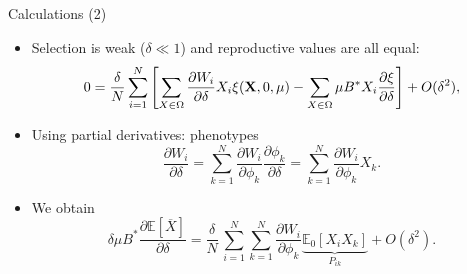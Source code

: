 \documentclass[aspectratio=169]{beamer}
\begin{document}
\begin{frame}{Calculations (2)}
\vspace{-0.75\baselineskip}
\begin{itemize}
\item Selection is weak ($\delta\ll 1$) and reproductive values are all equal:
\begin{displaymath}
0 = \frac{\delta}{N} \sum_{i=1}^N \left[  \sum_{X\in\Omega}\frac{\partial W_i}{\partial \delta} X_i \xi\tikzmark{xi}(\mathbf{X}, 0, \mu) - \sum_{X \in \Omega} \mu B^*\tikzmark{lastterm} X_i \frac{\partial \xi}{\partial \delta} \right] + O(\delta^2),
\end{displaymath}
\item<5-> Using partial derivatives: phenotypes
{\small
\begin{displaymath}
\frac{\partial W_i}{\partial \delta} = \sum_{k=1}^N \frac{\partial W_i}{\partial \phi_k} \frac{\partial \phi_k}{\partial \delta} = \sum_{k=1}^N \frac{\partial W_i}{\partial \phi_k} X_k.
\end{displaymath}
}
\item<6-> We obtain
\begin{displaymath}
\delta \mu B^* \frac{\partial \mathbb{E}[\overline{X}]}{\partial \delta} = \frac{\delta}{N} \, \sum_{i=1}^N \sum_{k=1}^N\frac{\partial W_i}{\partial \phi_k} \underbrace{\mathbb{E}_0\left[  X_i X_k \right]}_{P_{ik}}  + O(\delta^2).
\end{displaymath}
\end{itemize}
\end{frame}
\end{document}
